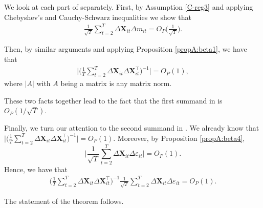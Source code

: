 \documentclass[a4paper,12pt]{article}
\makeatletter
\renewcommand{\eqref}[1]{\tagform@{\ref{#1}}}
\makeatother
\begin{document}
We look at each part of \eqref{eq:theo:beta} separately. First, by Assumption \ref{C-reg3} and applying Chebyshev's and Cauchy-Schwarz inequalities we show that
\begin{align*}
\frac{1}{\sqrt{T}}\sum_{t=2}^T \Delta \mathbf{X}_{it} \Delta m_{it}  = O_P\Big(\frac{1}{\sqrt{T}}\Big).
\end{align*}

Then, by similar arguments and applying Proposition \ref{propA:beta1}, we have that
\begin{align*}
\Bigg|  \Big(\frac{1}{T}\sum_{t=2}^T\Delta \mathbf{X}_{it} \Delta \mathbf{X}_{it}^\top\Big)^{-1}\Bigg| = O_P(1),
\end{align*}
where $|A|$ with $A$ being a matrix is any matrix norm.

These two facts together lead to the fact that the first summand in \eqref{eq:theo:beta} is $O_P(1/\sqrt{T})$.

Finally, we turn our attention to the second summand in \eqref{eq:theo:beta}. We already know that $\Big|  \big(\frac{1}{T}\sum_{t=2}^T\Delta \mathbf{X}_{it} \Delta \mathbf{X}_{it}^\top\big)^{-1}\Big| = O_P(1)$. Moreover, by Proposition \ref{propA:beta4}, 
\[ \bigg| \frac{1}{\sqrt{T}}\sum_{t=2}^T \Delta \mathbf{X}_{it}\Delta \varepsilon_{it} \bigg| = O_P(1).
\]
Hence, we have that 
\begin{align}\label{theo:beta:proof8}
\Big(\frac{1}{T} \sum_{t=2}^T \Delta \mathbf{X}_{it} \Delta \mathbf{X}_{it}^\top \Big)^{-1}\frac{1}{\sqrt{T}} \sum_{t=2}^T \Delta \mathbf{X}_{it} \Delta \varepsilon_{it} = O_P(1).
\end{align}

The statement of the theorem follows.



\end{document}
